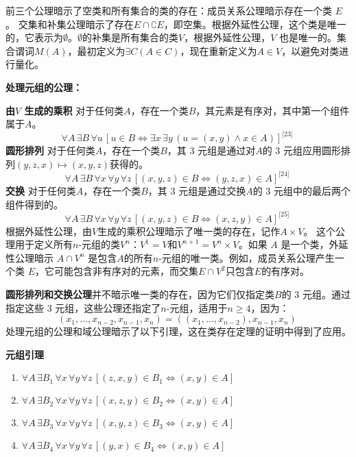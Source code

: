 前三个公理暗示了空类和所有集合的类的存在：成员关系公理暗示存在一个类 \( E \)。  交集和补集公理暗示了存在\( E \cap \complement E \)，即空集。根据外延性公理，这个类是唯一的，它表示为\( \emptyset \)。\( \emptyset \)的补集是所有集合的类\( V \)，根据外延性公理，\( V \) 也是唯一的。集合谓词\( M(A) \)，最初定义为\( \exists C (A \in C) \)，现在重新定义为\( A \in V \)，以避免对类进行量化。

\textbf{处理元组的公理：}

\textbf{由\( V \) 生成的乘积} 
对于任何类\( A \)，存在一个类\( B \)，其元素是有序对，其中第一个组件属于\( A \)。
\[
\forall A \, \exists B \, \forall u \, [u \in B \iff \exists x \, \exists y \, (u = (x, y) \land x \in A)]^\text{[23]}~
\]
\textbf{圆形排列} 
对于任何类\( A \)，存在一个类\( B \)，其 3 元组是通过对\( A \)的 3 元组应用圆形排列\( (y, z, x) \mapsto (x, y, z) \)获得的。
\[
\forall A \, \exists B \, \forall x \, \forall y \, \forall z \, [(x, y, z) \in B \iff (y, z, x) \in A]^\text{[24]}~
\]
\textbf{交换}  
对于任何类\( A \)，存在一个类\( B \)，其 3 元组是通过交换\( A \)的 3 元组中的最后两个组件得到的。
\[
\forall A \, \exists B \, \forall x \, \forall y \, \forall z \, [(x, y, z) \in B \iff (x, z, y) \in A]^\text{[25]}~
\]
根据外延性公理，由\( V \)生成的乘积公理暗示了唯一类的存在，记作\( A \times V \)。  
这个公理用于定义所有\( n \)-元组的类\( V^n \)：\( V^1 = V \)和\( V^{n+1} = V^n \times V \)。如果 \( A \) 是一个类，外延性公理暗示 \( A \cap V^n \) 是包含\( A \)的所有\( n \)-元组的唯一类。例如，成员关系公理产生一个类 \( E \)，它可能包含非有序对的元素，而交集\( E \cap V^2 \)只包含\( E \)的有序对。

\textbf{圆形排列和交换公理}并不暗示唯一类的存在，因为它们仅指定类\( B \)的 3 元组。通过指定这些 3 元组，这些公理还指定了\( n \)-元组，适用于\( n \geq 4 \)，因为：
\[
(x_1, \ldots, x_{n-2}, x_{n-1}, x_n) = ((x_1, \ldots, x_{n-2}), x_{n-1}, x_n)~
\]
处理元组的公理和域公理暗示了以下引理，这在类存在定理的证明中得到了应用。

\textbf{元组引理}
\begin{enumerate}
\item \(\forall A \, \exists B_1 \, \forall x \, \forall y \, \forall z \, [(z, x, y) \in B_1 \iff (x, y) \in A]\)
\item \(\forall A \, \exists B_2 \, \forall x \, \forall y \, \forall z \, [(x, z, y) \in B_2 \iff (x, y) \in A]\)
\item \(\forall A \, \exists B_3 \, \forall x \, \forall y \, \forall z \, [(x, y, z) \in B_3 \iff (x, y) \in A]\)
\item \(\forall A \, \exists B_4 \, \forall x \, \forall y \, \forall z \, [(y, x) \in B_4 \iff (x, y) \in A]\)
\end{enumerate}

